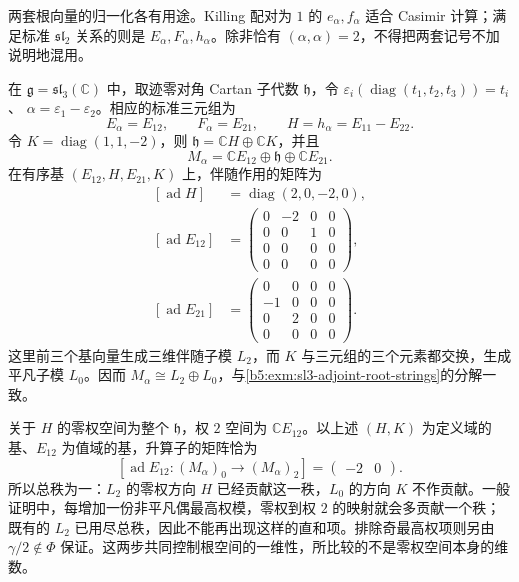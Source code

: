 两套根向量的归一化各有用途。Killing 配对为 \(1\) 的 \(e_\alpha,f_\alpha\) 适合 Casimir 计算；满足标准 \(\mathfrak{sl}_2\) 关系的则是 \(E_\alpha,F_\alpha,h_\alpha\)。除非恰有 \((\alpha,\alpha)=2\)，不得把两套记号不加说明地混用。

\begin{example}\label{b5:exm:sl3-zero-weight-rank}
	在 \(\mathfrak g=\mathfrak{sl}_3(\mathbb C)\) 中，取迹零对角 Cartan 子代数 \(\mathfrak h\)，令 \(\varepsilon_i(\operatorname{diag}(t_1,t_2,t_3))=t_i\)、 \(\alpha=\varepsilon_1-\varepsilon_2\)。相应的标准三元组为
	\[
		E_\alpha=E_{12},\qquad F_\alpha=E_{21},\qquad H=h_\alpha=E_{11}-E_{22}.
	\]
	令 \(K=\operatorname{diag}(1,1,-2)\)，则 \(\mathfrak h=\mathbb CH\oplus\mathbb CK\)，并且
	\[
		M_\alpha=\mathbb CE_{12}\oplus\mathfrak h\oplus\mathbb CE_{21}.
	\]
	在有序基 \((E_{12},H,E_{21},K)\) 上，伴随作用的矩阵为
	\[
		\begin{aligned}
			[\operatorname{ad}H]&=\operatorname{diag}(2,0,-2,0),\\
			[\operatorname{ad}E_{12}]&=
			\begin{pmatrix}0&-2&0&0\\0&0&1&0\\0&0&0&0\\0&0&0&0\end{pmatrix},\\
			[\operatorname{ad}E_{21}]&=
			\begin{pmatrix}0&0&0&0\\-1&0&0&0\\0&2&0&0\\0&0&0&0\end{pmatrix}.
		\end{aligned}
	\]
	这里前三个基向量生成三维伴随子模 \(L_2\)，而 \(K\) 与三元组的三个元素都交换，生成平凡子模 \(L_0\)。因而 \(M_\alpha\cong L_2\oplus L_0\)，与\cref{b5:exm:sl3-adjoint-root-strings}的分解一致。

	关于 \(H\) 的零权空间为整个 \(\mathfrak h\)，权 \(2\) 空间为 \(\mathbb CE_{12}\)。以上述 \((H,K)\) 为定义域的基、\(E_{12}\) 为值域的基，升算子的矩阵恰为
	\[
		\left[\operatorname{ad}E_{12}: (M_\alpha)_0\longrightarrow(M_\alpha)_2\right]
		=\begin{pmatrix}-2&0\end{pmatrix}.
	\]
	所以总秩为一：\(L_2\) 的零权方向 \(H\) 已经贡献这一秩，\(L_0\) 的方向 \(K\) 不作贡献。一般证明中，每增加一份非平凡偶最高权模，零权到权 \(2\) 的映射就会多贡献一个秩；既有的 \(L_2\) 已用尽总秩，因此不能再出现这样的直和项。排除奇最高权项则另由 \(\gamma/2\notin\Phi\) 保证。这两步共同控制根空间的一维性，所比较的不是零权空间本身的维数。
\end{example}


